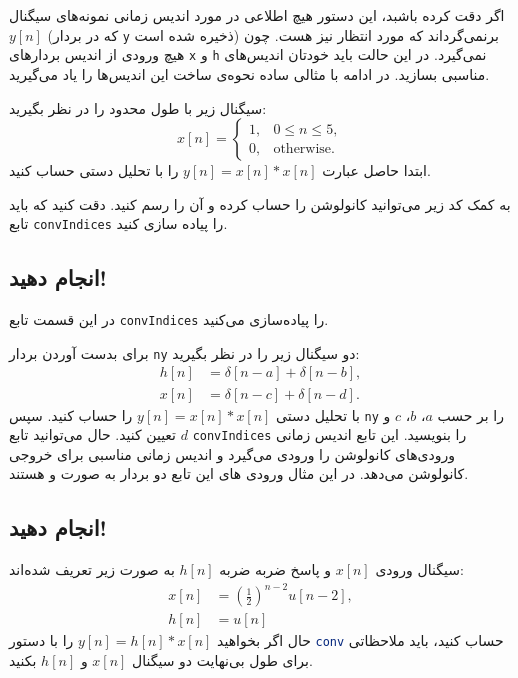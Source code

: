 \documentclass{utsignal}
\begin{document}
	اگر دقت کرده باشبد، این دستور هیچ اطلاعی در مورد اندیس زمانی نمونه‌های سیگنال $y[n]$ (که در بردار \lstinline[language=Octave]{y} ذخیره شده است) برنمی‌گرداند که مورد انتظار نیز هست. چون هیچ ورودی از اندیس بردارهای \lstinline[language=Octave]{x} و \lstinline[language=Octave]{h} نمی‌گیرد. در این حالت باید خودتان اندیس‌‌های مناسبی بسازید. در ادامه با مثالی ساده نحوه‌ی ساخت این اندیس‌ها را یاد می‌گیرید.
	
	سیگنال زیر با طول محدود را در نظر بگیرید:
	$$
	x[n]=\begin{cases}
		1, & 0 \le n \le 5,\\
		0, & \text{otherwise}.
	\end{cases}
	$$
	ابتدا حاصل عبارت $y[n]=x[n]*x[n]$ را با تحلیل دستی حساب کنید.
	
	به کمک کد زیر می‌توانید کانولوشن را حساب کرده و آن را رسم کنید. دقت کنید که باید تابع \lstinline[language=Octave]{convIndices} را پیاده سازی کنید.
	\begin{latin}
		
	\end{latin}
	
	\subsection{انجام دهید!}
	در این قسمت تابع \lstinline[language=Octave]{convIndices} را پیاده‌سازی می‌کنید.
	
	برای بدست آوردن بردار \lstinline[language=Octave]{ny} دو سیگنال زیر را در نظر بگیرید:
	\begin{align*}
	h[n] &= \delta[n - a] + \delta[n - b],\\
	x[n] &= \delta[n - c] + \delta[n - d].
	\end{align*}
	با تحلیل دستی $y[n]=x[n]*x[n]$ را حساب کنید. سپس \lstinline[language=Octave]{ny} را بر حسب $a$، $b$، $c$ و $d$ تعیین کنید. حال می‌توانید تابع  \lstinline[language=Octave]{convIndices} را بنویسید. این تابع اندیس زمانی ورودی‌های کانولوشن را ورودی می‌گیرد و اندیس زمانی مناسبی برای خروجی کانولوشن می‌دهد. در این مثال ورودی های این تابع دو بردار به صورت  و  هستند.
	\subsection{انجام دهید!}
		سیگنال ورودی $x[n]$ و پاسخ ضربه ضربه $h[n]$ به صورت زیر تعریف شده‌اند:
		\begin{align*}
			x[n] &= \left(\frac{1}{2}\right)^{n-2}u[n-2],\\
			h[n]‌&= u[n]
		\end{align*}
		حال اگر بخواهید $y[n]=h[n]*x[n]$ را با دستور \lstinline[language=Octave]{conv} حساب کنید، باید ملاحظاتی برای طول بی‌نهایت دو سیگنال $x[n]$ و $h[n]$ بکنید.
		
\end{document}
